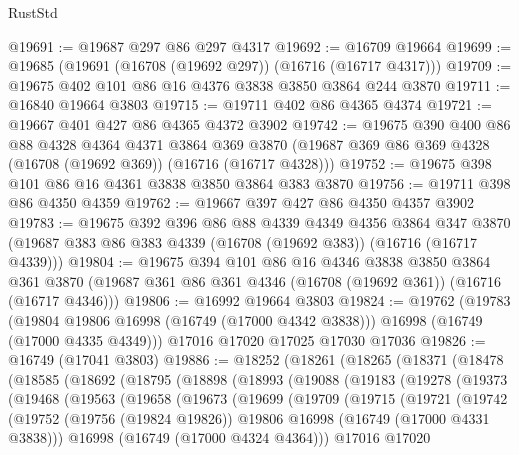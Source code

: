 \begin{lexlean}{RustStd}
\begin{coremodule}
@19691 := @19687 @297 @86 @297 @4317
@19692 := @16709 @19664
@19699 := @19685 (@19691 (@16708 (@19692 @297)) (@16716 (@16717 @4317)))
@19709 := @19675 @402 @101 @86 @16 @4376 @3838 @3850 @3864 @244 @3870
@19711 := @16840 @19664 @3803
@19715 := @19711 @402 @86 @4365 @4374
@19721 := @19667 @401 @427 @86 @4365 @4372 @3902
@19742 := @19675
    @390
    @400
    @86
    @88
    @4328
    @4364
    @4371
    @3864
    @369
    @3870
    (@19687 @369 @86 @369 @4328 (@16708 (@19692 @369)) (@16716 (@16717 @4328)))
@19752 := @19675 @398 @101 @86 @16 @4361 @3838 @3850 @3864 @383 @3870
@19756 := @19711 @398 @86 @4350 @4359
@19762 := @19667 @397 @427 @86 @4350 @4357 @3902
@19783 := @19675
    @392
    @396
    @86
    @88
    @4339
    @4349
    @4356
    @3864
    @347
    @3870
    (@19687 @383 @86 @383 @4339 (@16708 (@19692 @383)) (@16716 (@16717 @4339)))
@19804 := @19675
    @394
    @101
    @86
    @16
    @4346
    @3838
    @3850
    @3864
    @361
    @3870
    (@19687 @361 @86 @361 @4346 (@16708 (@19692 @361)) (@16716 (@16717 @4346)))
@19806 := @16992 @19664 @3803
@19824 := @19762
    (@19783
      (@19804 @19806 @16998 (@16749 (@17000 @4342 @3838)))
      @16998
      (@16749 (@17000 @4335 @4349)))
    @17016
    @17020
    @17025
    @17030
    @17036
@19826 := @16749 (@17041 @3803)
@19886 := @18252
    (@18261
      (@18265
        (@18371
          (@18478
            (@18585
              (@18692
                (@18795
                  (@18898
                    (@18993
                      (@19088
                        (@19183
                          (@19278
                            (@19373
                              (@19468
                                (@19563
                                  (@19658
                                    (@19673
                                      (@19699
                                        (@19709
                                          (@19715
                                            (@19721
                                              (@19742
                                                (@19752
                                                  (@19756 (@19824 @19826))
                                                  @19806
                                                  @16998
                                                  (@16749 (@17000 @4331 @3838)))
                                                @16998
                                                (@16749 (@17000 @4324 @4364)))
                                              @17016
                                              @17020

\end{coremodule}
\end{lexlean}

